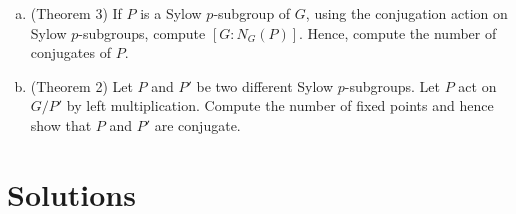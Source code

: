 \documentclass[12pt]{article}
\begin{document}
\begin{enumerate}[(a)]
  (Theorem 1) Consider a $p$-subgroup $P$ of $G$, let $P$ act on $G/P$ by left multiplication. Compute the fixed points. Apply induction and Cauchy's theorem (with some extra work) on these fixed points, and prove that Sylow $p$-subgroups exist.
  \item (Theorem 3) If $P$ is a Sylow $p$-subgroup of $G$, using the conjugation action on Sylow $p$-subgroups, compute $[G:N_G(P)]$. Hence, compute the number of conjugates of $P$.
  \item (Theorem 2) Let $P$ and $P'$ be two different Sylow $p$-subgroups. Let $P$ act on $G/P'$ by left multiplication. Compute the number of fixed points and hence show that $P$ and $P'$ are conjugate.
\end{enumerate}

\newpage

\section*{Solutions}
\end{document}

